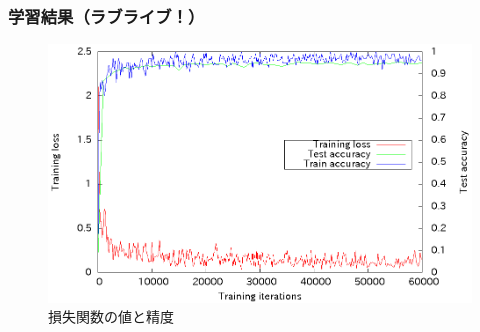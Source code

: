 \documentclass[dvipdfmx,11pt,notheorems]{beamer}
\theoremstyle{definition}
\begin{document}

\begin{frame}\frametitle{学習結果（ラブライブ！）}
 \begin{figure}[ht]
 \centering
 \includegraphics[scale=1.0]{fig/eps/result_train_test_lovelive_full.eps}
 \caption{損失関数の値と精度}
\end{figure}
\end{frame}
\end{document}
